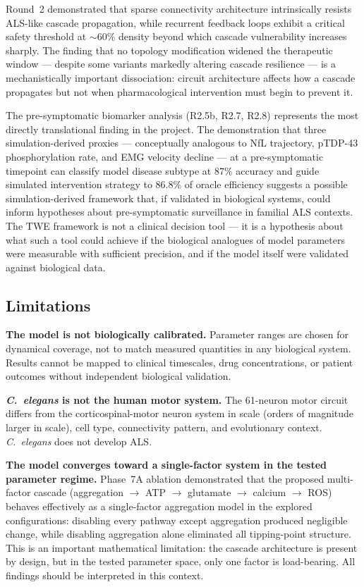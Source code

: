 \documentclass[12pt,a4paper]{article}
\begin{document}
Round~2 demonstrated that sparse connectivity architecture intrinsically resists ALS-like
cascade propagation, while recurrent feedback loops exhibit a critical safety threshold at
${\sim}60\%$ density beyond which cascade vulnerability increases sharply. The finding that no
topology modification widened the therapeutic window --- despite some variants markedly altering
cascade resilience --- is a mechanistically important dissociation: circuit architecture affects
how a cascade propagates but not when pharmacological intervention must begin to prevent it.

The pre-symptomatic biomarker analysis (R2.5b, R2.7, R2.8) represents the most directly
translational finding in the project. The demonstration that three simulation-derived proxies --- conceptually analogous to NfL
trajectory, pTDP-43 phosphorylation rate, and EMG velocity decline --- at a pre-symptomatic
timepoint can classify model disease subtype at 87\% accuracy and guide simulated intervention
strategy to 86.8\% of oracle efficiency suggests a possible simulation-derived framework that,
if validated in biological systems, could inform hypotheses about pre-symptomatic surveillance
in familial ALS contexts. The TWE framework is not a clinical decision tool --- it is a
hypothesis about what such a tool could achieve if the biological analogues of model parameters
were measurable with sufficient precision, and if the model itself were validated against
biological data.

\subsection{Limitations}

\textbf{The model is not biologically calibrated.}
Parameter ranges are chosen for dynamical coverage, not to match measured quantities in any
biological system. Results cannot be mapped to clinical timescales, drug concentrations, or
patient outcomes without independent biological validation.

\textbf{\textit{C.~elegans} is not the human motor system.}
The 61-neuron motor circuit differs from the corticospinal-motor neuron system in scale (orders
of magnitude larger in scale), cell type, connectivity pattern, and evolutionary context.
\textit{C.~elegans} does not develop ALS.

\textbf{The model converges toward a single-factor system in the tested parameter regime.}
Phase~7A ablation demonstrated that the proposed multi-factor cascade (aggregation $\to$ ATP
$\to$ glutamate $\to$ calcium $\to$ ROS) behaves effectively as a single-factor aggregation
model in the explored configurations: disabling every pathway except aggregation produced
negligible change, while disabling aggregation alone eliminated all tipping-point structure.
This is an important mathematical limitation: the cascade architecture is present by design, but
in the tested parameter space, only one factor is load-bearing. All findings should be
interpreted in this context.
\end{document}
